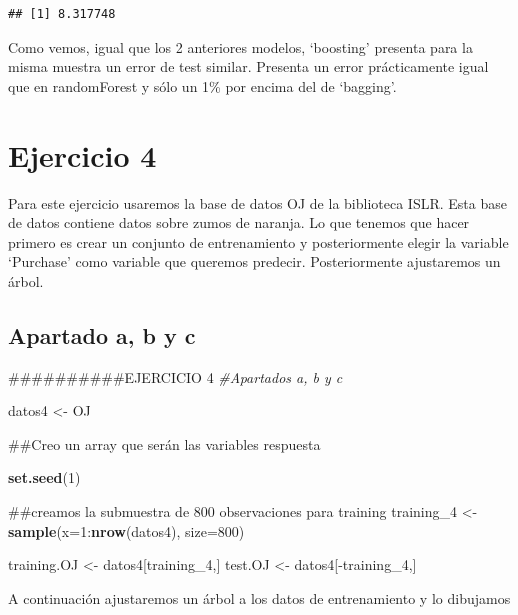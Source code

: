 \documentclass[]{article}
\newenvironment{Shaded}{\begin{snugshade}}{\end{snugshade}}
\newcommand{\KeywordTok}[1]{\textcolor[rgb]{0.13,0.29,0.53}{\textbf{{#1}}}}
\newcommand{\DataTypeTok}[1]{\textcolor[rgb]{0.13,0.29,0.53}{{#1}}}
\newcommand{\DecValTok}[1]{\textcolor[rgb]{0.00,0.00,0.81}{{#1}}}
\newcommand{\StringTok}[1]{\textcolor[rgb]{0.31,0.60,0.02}{{#1}}}
\newcommand{\CommentTok}[1]{\textcolor[rgb]{0.56,0.35,0.01}{\textit{{#1}}}}
\newcommand{\NormalTok}[1]{{#1}}
\begin{document}
\begin{verbatim}
## [1] 8.317748
\end{verbatim}

Como vemos, igual que los 2 anteriores modelos, `boosting' presenta para
la misma muestra un error de test similar. Presenta un error
prácticamente igual que en randomForest y sólo un 1\% por encima del de
`bagging'.

\section{Ejercicio 4}\label{ejercicio-4}

Para este ejercicio usaremos la base de datos OJ de la biblioteca ISLR.
Esta base de datos contiene datos sobre zumos de naranja. Lo que tenemos
que hacer primero es crear un conjunto de entrenamiento y posteriormente
elegir la variable `Purchase' como variable que queremos predecir.
Posteriormente ajustaremos un árbol.

\subsection{Apartado a, b y c}\label{apartado-a-b-y-c}

\begin{Shaded}
\begin{Highlighting}[]
\NormalTok{##########EJERCICIO 4}
\CommentTok{#Apartados a, b y c}


\NormalTok{datos4 <-}\StringTok{ }\NormalTok{OJ}

\NormalTok{##Creo un array que serán las variables respuesta}

\KeywordTok{set.seed}\NormalTok{(}\DecValTok{1}\NormalTok{)}

\NormalTok{##creamos la submuestra de 800 observaciones para training}
\NormalTok{training_4 <-}\StringTok{ }\KeywordTok{sample}\NormalTok{(}\DataTypeTok{x=}\DecValTok{1}\NormalTok{:}\KeywordTok{nrow}\NormalTok{(datos4), }\DataTypeTok{size=}\DecValTok{800}\NormalTok{)}

\NormalTok{training.OJ <-}\StringTok{ }\NormalTok{datos4[training_4,]}
\NormalTok{test.OJ <-}\StringTok{ }\NormalTok{datos4[-training_4,]}
\end{Highlighting}
\end{Shaded}

A continuación ajustaremos un árbol a los datos de entrenamiento y lo
dibujamos

\begin{Shaded}
\end{Shaded}
\end{document}
